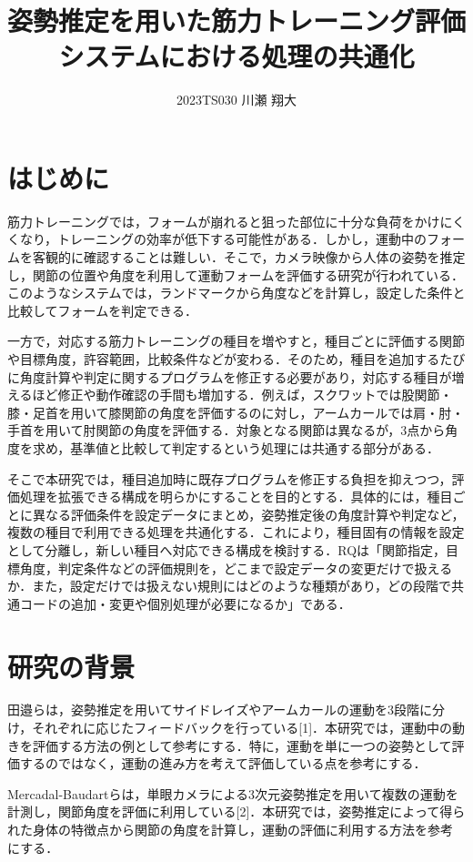 \documentclass[no-page-number]{nanzan-abstract}
\title{姿勢推定を用いた筋力トレーニング評価システムにおける処理の共通化}
\author{2023TS030 川瀬 翔大}
\begin{document}
\maketitle

\section{はじめに}

筋力トレーニングでは，フォームが崩れると狙った部位に十分な負荷をかけにくくなり，トレーニングの効率が低下する可能性がある．しかし，運動中のフォームを客観的に確認することは難しい．そこで，カメラ映像から人体の姿勢を推定し，関節の位置や角度を利用して運動フォームを評価する研究が行われている．このようなシステムでは，ランドマークから角度などを計算し，設定した条件と比較してフォームを判定できる．

一方で，対応する筋力トレーニングの種目を増やすと，種目ごとに評価する関節や目標角度，許容範囲，比較条件などが変わる．そのため，種目を追加するたびに角度計算や判定に関するプログラムを修正する必要があり，対応する種目が増えるほど修正や動作確認の手間も増加する．例えば，スクワットでは股関節・膝・足首を用いて膝関節の角度を評価するのに対し，アームカールでは肩・肘・手首を用いて肘関節の角度を評価する．対象となる関節は異なるが，3点から角度を求め，基準値と比較して判定するという処理には共通する部分がある．

そこで本研究では，種目追加時に既存プログラムを修正する負担を抑えつつ，評価処理を拡張できる構成を明らかにすることを目的とする．具体的には，種目ごとに異なる評価条件を設定データにまとめ，姿勢推定後の角度計算や判定など，複数の種目で利用できる処理を共通化する．これにより，種目固有の情報を設定として分離し，新しい種目へ対応できる構成を検討する．RQは「関節指定，目標角度，判定条件などの評価規則を，どこまで設定データの変更だけで扱えるか．また，設定だけでは扱えない規則にはどのような種類があり，どの段階で共通コードの追加・変更や個別処理が必要になるか」である．

\section{研究の背景}

田邉らは，姿勢推定を用いてサイドレイズやアームカールの運動を3段階に分け，それぞれに応じたフィードバックを行っている[1]．本研究では，運動中の動きを評価する方法の例として参考にする．特に，運動を単に一つの姿勢として評価するのではなく，運動の進み方を考えて評価している点を参考にする．

Mercadal-Baudartらは，単眼カメラによる3次元姿勢推定を用いて複数の運動を計測し，関節角度を評価に利用している[2]．本研究では，姿勢推定によって得られた身体の特徴点から関節の角度を計算し，運動の評価に利用する方法を参考にする．
\end{document}
